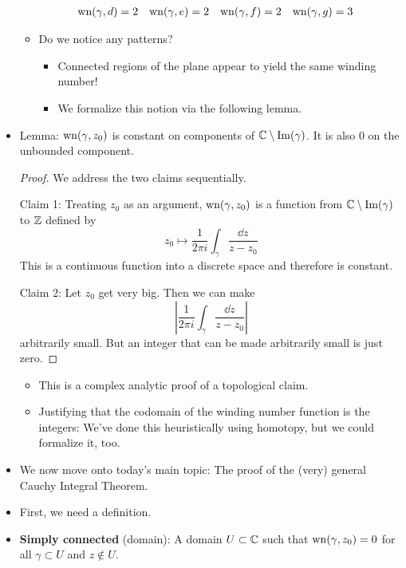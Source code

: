 \documentclass[../notes.tex]{subfiles}
\begin{document}
\begin{itemize}
\begin{itemize}
\begin{align*}
            \operatorname{wn}(\gamma,d) &= 2&
            \operatorname{wn}(\gamma,e) &= 2&
            \operatorname{wn}(\gamma,f) &= 2&
            \operatorname{wn}(\gamma,g) &= 3
        \end{align*}
        \item Do we notice any patterns?
        \begin{itemize}
            \item Connected regions of the plane appear to yield the same winding number!
            \item We formalize this notion via the following lemma.
        \end{itemize}
    \end{itemize}
    \item Lemma: $\operatorname{wn}(\gamma,z_0)$ is constant on components of $\mathbb{C}\setminus\operatorname{Im}(\gamma)$. It is also 0 on the unbounded component.
    \begin{proof}
        We address the two claims sequentially.\par
        Claim 1: Treating $z_0$ as an argument, $\operatorname{wn}(\gamma,z_0)$ is a function from $\mathbb{C}\setminus\operatorname{Im}(\gamma)$ to $\mathbb{Z}$ defined by
        \begin{equation*}
            z_0 \mapsto \frac{1}{2\pi i}\int_\gamma\frac{\dd{z}}{z-z_0}
        \end{equation*}
        This is a continuous function into a discrete space and therefore is constant.\par
        Claim 2: Let $z_0$ get very big. Then we can make
        \begin{equation*}
            \left| \frac{1}{2\pi i}\int_\gamma\frac{\dd{z}}{z-z_0} \right|
        \end{equation*}
        arbitrarily small. But an integer that can be made arbitrarily small is just zero.
    \end{proof}
    \begin{itemize}
        \item This is a complex analytic proof of a topological claim.
        \item Justifying that the codomain of the winding number function is the integers: We've done this heuristically using homotopy, but we could formalize it, too.
    \end{itemize}
    \item We now move onto today's main topic: The proof of the (very) general Cauchy Integral Theorem.
    \item First, we need a definition.
    \item \textbf{Simply connected} (domain): A domain $U\subset\mathbb{C}$ such that $\operatorname{wn}(\gamma,z_0)=0$ for all $\gamma\subset U$ and $z\notin U$.

\end{itemize}
\end{document}

